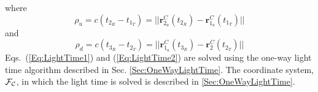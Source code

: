 %
where
%
\begin{equation}
   \rho_u = c \left ( t_{2_R} - t_{1_T}\right)= || \mathbf{r}_{2_{a}}^C(t_{2_R}) - \mathbf{r}_{1_{a}}^C(t_{1_T}) || \label{Eq:LightTime1}
\end{equation}
%
and
%
\begin{equation}
   \rho_d = c \left ( t_{3_R} - t_{2_T}\right) = || \mathbf{r}_{1_a}^C(t_{3_R}) - \mathbf{r}_2^C(t_{2_{T}}) || \label{Eq:LightTime2}
\end{equation}
%
Eqs.~(\ref{Eq:LightTime1}) and (\ref{Eq:LightTime2}) are solved using the one-way light time algorithm described in Sec. \ref{Sec:OneWayLightTime}.  The coordinate system, $\mcF_{\mathcal{C}}$, in which the light time is solved is described in \ref{Sec:OneWayLightTime}.


%


